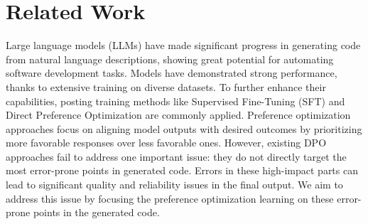 \section{Related Work}
Large language models (LLMs) have made significant progress in generating code from natural language descriptions, showing great potential for automating software development tasks. Models\citep{GPT-4,li2023starcoder,qwencoder, guo2024deepseek, aixcoder} have demonstrated strong performance, thanks to extensive training on diverse datasets. To further enhance their capabilities, posting training methods like Supervised Fine-Tuning (SFT) \cite{luo2023wizardcoder, wei2023magicoder} and Direct Preference Optimization \cite{qwencoder, codedpo, stepcoder, codeoptimise, plum} are commonly applied. Preference optimization approaches focus on aligning model outputs with desired outcomes by prioritizing more favorable responses over less favorable ones. 
However, existing DPO approaches fail to address one important issue: they do not directly target the most error-prone points in generated code. Errors in these high-impact parts can lead to significant quality and reliability issues in the final output. 
We aim to address this issue by focusing the preference optimization learning on these error-prone points in the generated code. 


